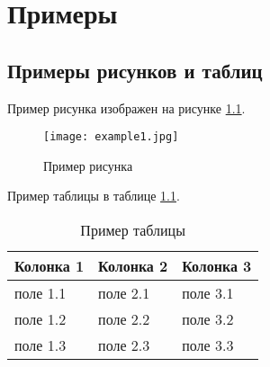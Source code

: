 \chapter{Примеры}



\section{Примеры рисунков и таблиц}

Пример рисунка изображен на рисунке \ref{fig:example1}.
\begin{figure}[h!]
	\centering
	\texttt{[image: example1.jpg]}
	\caption{Пример рисунка}
	\label{fig:example1}
\end{figure}

Пример таблицы в таблице \ref{table:example1}.

\begin{table}[h!]
\captionstyle{\justifying}
	\caption{Пример таблицы}
		\begin{adjustbox}{width=1\textwidth}
			\small
			\begin{tabular}{|m{3.9cm}|l|m{3cm}|}
				\hline
				\textbf{Колонка 1} & \textbf{Колонка 2} & \textbf{Колонка 3} \\ \hline
				поле 1.1 & поле 2.1 & поле 3.1 \\ \hline
				поле 1.2 & поле 2.2 & поле 3.2 \\ \hline
				поле 1.3 & поле 2.3 & поле 3.3 \\ \hline
			\end{tabular}
		\end{adjustbox}	
	\label{table:example1}
\end{table}